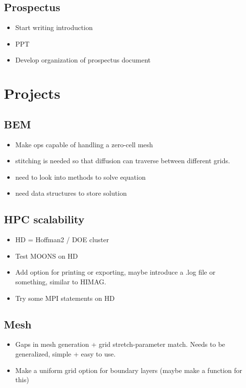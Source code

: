 \documentclass[11pt]{article}
\begin{document}
\subsection{Prospectus}
\begin{itemize}
\setlength\itemsep{-1em}
\item Start writing introduction
\item PPT
\item Develop organization of prospectus document
\end{itemize}

\section{Projects}

\subsection{BEM}
\begin{itemize}
\setlength\itemsep{-1em}
\item Make ops capable of handling a zero-cell mesh
\item stitching is needed so that diffusion can traverse between different grids.
\item need to look into methods to solve equation
\item need data structures to store solution
\end{itemize}

\subsection{HPC scalability}
\begin{itemize}
\setlength\itemsep{-1em}
\item HD = Hoffman2 / DOE cluster
\item Test MOONS on HD
\item Add option for printing or exporting, maybe introduce a .log file or something, similar to HIMAG.
\item Try some MPI statements on HD
\end{itemize}

\subsection{Mesh}
\begin{itemize}
\setlength\itemsep{-1em}
\item Gaps in mesh generation + grid stretch-parameter match. Needs to be generalized, simple + easy to use.
\item Make a uniform grid option for boundary layers (maybe make a function for this)
\end{itemize}
\end{document}
